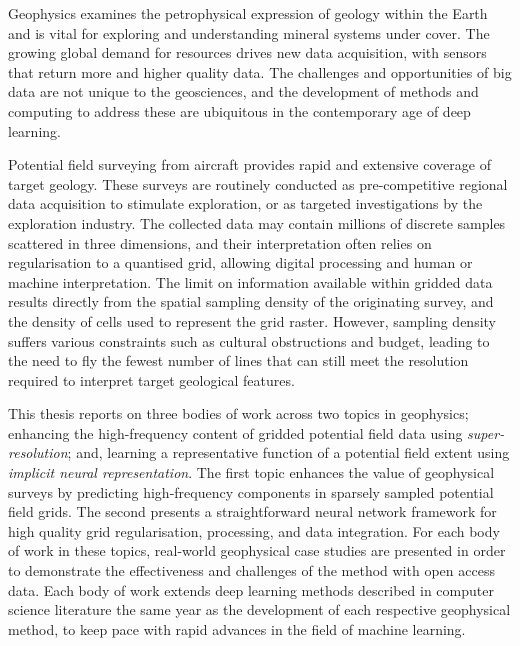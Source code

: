 \documentclass[12pt,a4paper]{report} %
\begin{document}
Geophysics examines the petrophysical expression of geology within the Earth and is vital for exploring and understanding mineral systems under cover.
The growing global demand for resources drives new data acquisition, with sensors that return more and higher quality data.
The challenges and opportunities of big data are not unique to the geosciences, and the development of methods and computing to address these are ubiquitous in the contemporary age of deep learning.

Potential field surveying from aircraft provides rapid and extensive coverage of target geology.
These surveys are routinely conducted as pre-competitive regional data acquisition to stimulate exploration, or as targeted investigations by the exploration industry.
The collected data may contain millions of discrete samples scattered in three dimensions, and their interpretation often relies on regularisation to a quantised grid, allowing digital processing and human or machine interpretation.
The limit on information available within gridded data results directly from the spatial sampling density of the originating survey, and the density of cells used to represent the grid raster.
However, sampling density suffers various constraints such as cultural obstructions and budget, leading to the need to fly the fewest number of lines that can still meet the resolution required to interpret target geological features.

This thesis reports on three bodies of work across two topics in geophysics; enhancing the high-frequency content of gridded potential field data using \emph{super-resolution}; and, learning a representative function of a potential field extent using \emph{implicit neural representation}.
The first topic enhances the value of geophysical surveys by predicting high-frequency components in sparsely sampled potential field grids.
The second presents a straightforward neural network framework for high quality grid regularisation, processing, and data integration.
For each body of work in these topics, real-world geophysical case studies are presented in order to demonstrate the effectiveness and challenges of the method with open access data.
Each body of work extends deep learning methods described in computer science literature the same year as the development of each respective geophysical method, to keep pace with rapid advances in the field of machine learning.
\end{document}
